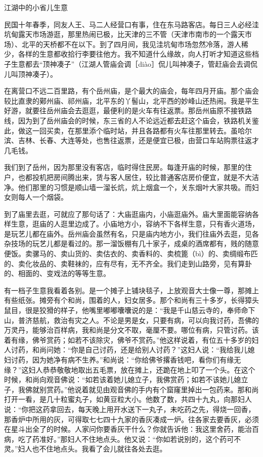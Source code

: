\documentclass[12pt,UTF8]{ctexbook}
\begin{document}
江湖中的小省儿生意


民国十年春季，同友人王、马二人经营口有事，住在东马路客店。每日三人必经洼坑甸露天市场游逛，那里热闹已极，比天津的三不管（天津市南市的一个露天市场）、北平的天桥都不在以下。到了四月间，我见洼坑甸市场忽然冷落，游人稀少，各样的生意都收拾行李要往他方。我不知道什么缘故，向人打听才知道这些档子生意都去“顶神凑子”（江湖人管庙会调［diào］侃儿叫神凑子，管赶庙会去调侃儿叫顶神凑子）。

在离营口不远二百里路，有个岳州庙，是个最大的庙会，每年四月开庙。那个庙会较比直隶的鄚州庙、祁州庙，北平东的丫髻山，北平西的妙峰山还热闹。我是平生好游，就要往岳州庙会去逛逛，最便利的是火车有往返票。那岳州庙原不接铁路线，因为到了岳州庙会的时候，东三省的人不论远近都去赶这个庙会，铁路机关鉴此，做这一回买卖，在那里添个临时站，并且各路都有火车往那里转去。虽哈尔滨、吉林、长春、大连等处，也售往返票，还是便宜已极，由营口车站购票往返才几毛钱。

我们到了岳州，因为那里没有客店，临时得住民房。每逢开庙的时候，那里的住户，也都投机把房间腾出来，赁与客人居住，较比普通客店房价便宜，就是不大洁净。他们那里的习惯是顺山墙一溜长炕，炕上烟盒一个，关东烟叶大家共吸。而妇女则每人一个烟袋。

到了庙里去逛，可就应了那句话了：大庙逛庙内，小庙逛庙外。庙大里面能容纳各样生意，逛庙的人逛里边成了。小庙地方小，容纳不下各样生意，只有香火道场，是玩艺儿都在庙外。岳州庙会虽然有名，只是庙内地方小，我们往庙外去逛，见各杂技场的玩艺儿都是看过的。那一溜饭棚有几十家子，成桌的酒席都有，贱的随意便饭。卖骡马的、卖山货的、卖估衣的、卖香料的、卖梳篦（bì）的、卖绸缎布匹的、卖化妆品的、卖鞋袜的，应有尽有，无不齐全。我们走到山路旁，见有算卦的、相面的、变戏法的等等生意。

有一档子生意我看着各别。是一个摊子上铺块毯子，上放观音大士像一尊，那摊上有些纸张。摊旁有个和尚，围着的人，妇女居多。那个和尚有三十多岁，长得獐头鼠目，很是狡猾的样子，他嘴里嘟嘟囔囔说的是：“我是千山慈云寺的，奉师命下山，普济慈航，救治有灾之人。不论是男是女，只要有病，可以向我讨药，吾佛的万灵丹，能够治百样病，我和尚是分文不取，毫厘不要。哪位有病，只管讨药。该着有缘，佛爷赏药；如若不该除灾，佛爷不赏药。”他这样说着，有位五十多岁的妇人讨药，和尚问她：“你是自己讨药，还是给别人讨药？”这妇人说：“我给我儿媳妇讨药，因为她净有病不生养。”和尚说：“你给佛爷撂香钱吧，看你们有缘无缘？”这妇人恭恭敬敬地取出五毛票，放在摊上，还跪在地上叩了一个头。在这个时候，和尚向观音佛说：“如若该着她儿媳立子，我佛赏药；如若不该她儿媳立子，我佛就别赏药。”他说着就见由观音佛的手内有个窟窿里掉出一包药来。那和尚打开一看，是几十粒蜜丸子，如黄豆粒大小。他数了数，共四十九丸，向那妇人说：“你把这药拿回去，每天晚上用开水送下一丸子，未吃药之先，得烧一回香，那香炉中所用的灰，可得取七七四十九家的香灰凑成一炉。往各家去要香灰，必须在星斗出全了的时候。人家问你要香灰干什么？你就告诉他：我这里舍药，能治百病，吃了药准好。”那妇人不住地点头。他又说：“你如若说别的，这个药可不灵。”妇人也不住地点头。我看了会儿就往各处去逛。
\end{document}
